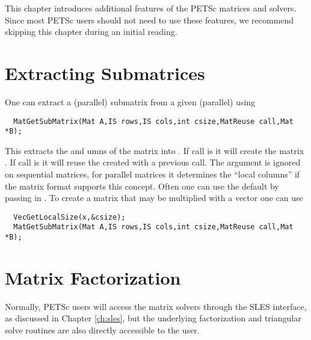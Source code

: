 This chapter introduces additional features of the PETSc matrices and solvers.
Since most PETSc users should not need to use these features, 
we recommend skipping this chapter during an initial reading.

\medskip \medskip

\section{Extracting Submatrices} 

One can extract a (parallel) submatrix from a given (parallel) using
\begin{verbatim}
  MatGetSubMatrix(Mat A,IS rows,IS cols,int csize,MatReuse call,Mat *B);
\end{verbatim}
This extracts the  and umns of the matrix  into . If 
call is    it will create the matrix
. If call is   it will reuse the 
created with a previous call.  The argument  is ignored 
on sequential matrices, for parallel matrices it determines the ``local columns'' if the matrix
format supports this concept. Often one can use the default by passing in .
To create a  matrix that may be multiplied with a vector  one can use
\begin{verbatim}
  VecGetLocalSize(x,&csize);
  MatGetSubMatrix(Mat A,IS rows,IS cols,int csize,MatReuse call,Mat *B);
\end{verbatim}


\medskip \medskip

\section{Matrix Factorization} 
\label{sec:matfactor}

Normally, PETSc users will access the matrix solvers through the 
SLES interface, as discussed in Chapter \ref{ch:sles}, but the underlying 
factorization and triangular solve routines are also directly 
accessible to the user.

\medskip \medskip

